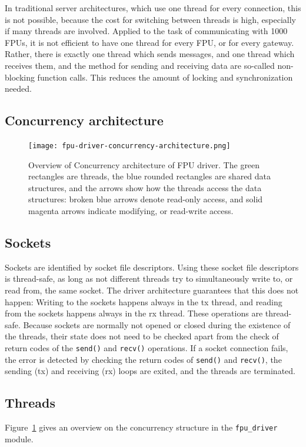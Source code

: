 \documentclass[fontsize=12,a4paper]{scrartcl}
\begin{document}
In traditional server architectures, which use one thread for every
connection, this is not possible, because the cost for switching
between threads is high, especially if many threads are
involved. Applied to the task of communicating with 1000 FPUs, it is
not efficient to have one thread for every FPU, or for every
gateway. Rather, there is exactly one thread which sends messages, and
one thread which receives them, and the method for sending and
receiving data are so-called non-blocking function calls.  This
reduces the amount of locking and synchronization needed.

\subsection{Concurrency architecture}
\begin{figure}
\texttt{[image: fpu-driver-concurrency-architecture.png]}
\caption[Overview of Concurrency architecture of FPU driver]{Overview
  of Concurrency architecture of FPU driver. The green rectangles are
  threads, the blue rounded rectangles are shared data structures, and
  the arrows show how the threads access the data structures: broken
  blue arrows denote read-only access, and solid magenta arrows
  indicate modifying, or read-write access.}
\label{fig:overview}
\end{figure}

\subsection{Sockets}


Sockets are identified by socket file descriptors.  Using these socket
file descriptors is thread-safe, as long as not different threads try
to simultaneously write to, or read from, the same socket. The driver
architecture guarantees that this does not happen: Writing to the
sockets happens always in the tx thread, and reading from the sockets
happens always in the rx thread.  These operations are
thread-safe. Because sockets are normally not opened or closed during
the existence of the threads, their state does not need to be checked
apart from the check of return codes of the \texttt{send()} and
\texttt{recv()} operations. If a socket connection fails, the error is
detected by checking the return codes of \texttt{send()} and
\texttt{recv()}, the sending (tx) and receiving (rx) loops are exited,
and the threads are terminated.


\subsection{Threads}
Figure~\ref{fig:overview} gives an overview on the concurrency
structure in the \texttt{fpu\_driver} module.
\end{document}
